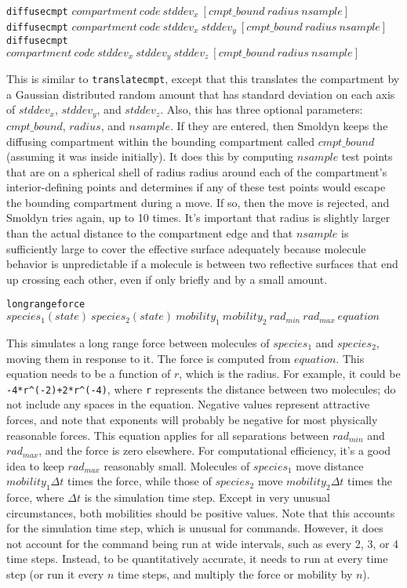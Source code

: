 \documentclass {scrbook}
\newcommand {\ttt} {\texttt}
\begin{document}
\begin{description}
\item{\ttt{diffusecmpt} $compartment\ code\ stddev_x\ [cmpt\_bound\ radius\ nsample]$\\
\ttt{diffusecmpt} $compartment\ code\ stddev_x\ stddev_y\ [cmpt\_bound\ radius\ nsample]$\\
\ttt{diffusecmpt} $compartment\ code\ stddev_x\ stddev_y\ stddev_z\ [cmpt\_bound\ radius\ nsample]$}

This is similar to \ttt{translatecmpt}, except that this translates the compartment by a Gaussian distributed random amount that has standard deviation on each axis of $stddev_x$, $stddev_y$, and $stddev_z$. Also, this has three optional parameters: $cmpt\_bound$, $radius$, and $nsample$. If they are entered, then Smoldyn keeps the diffusing compartment within the bounding compartment called $cmpt\_bound$ (assuming it was inside initially). It does this by computing $nsample$ test points that are on a spherical shell of radius radius around each of the compartment's interior-defining points and determines if any of these test points would escape the bounding compartment during a move. If so, then the move is rejected, and Smoldyn tries again, up to 10 times. It's important that radius is slightly larger than the actual distance to the compartment edge and that $nsample$ is sufficiently large to cover the effective surface adequately because molecule behavior is unpredictable if a molecule is between two reflective surfaces that end up crossing each other, even if only briefly and by a small amount.

\item{\ttt{longrangeforce} $species_1(state)\ species_2(state)\ mobility_1\ mobility_2\ rad_{min}\ rad_{max}\ equation$}

This simulates a long range force between molecules of $species_1$ and $species_2$, moving them in response to it. The force is computed from $equation$. This equation needs to be a function of $r$, which is the radius. For example, it could be \ttt{-4*r\^{}(-2)+2*r\^{}(-4)}, where \ttt{r} represents the distance between two molecules; do not include any spaces in the equation. Negative values represent attractive forces, and note that exponents will probably be negative for most physically reasonable forces. This equation applies for all separations between $rad_{min}$ and $rad_{max}$, and the force is zero elsewhere. For computational efficiency, it's a good idea to keep $rad_{max}$ reasonably small. Molecules of $species_1$ move distance $mobility_1 \Delta t$ times the force, while those of $species_2$ move $mobility_2 \Delta t$ times the force, where $\Delta t$ is the simulation time step. Except in very unusual circumstances, both mobilities should be positive values. Note that this accounts for the simulation time step, which is unusual for commands. However, it does not account for the command being run at wide intervals, such as every 2, 3, or 4 time steps. Instead, to be quantitatively accurate, it needs to run at every time step (or run it every $n$ time steps, and multiply the force or mobility by $n$).


\end{description}
\end{document}
